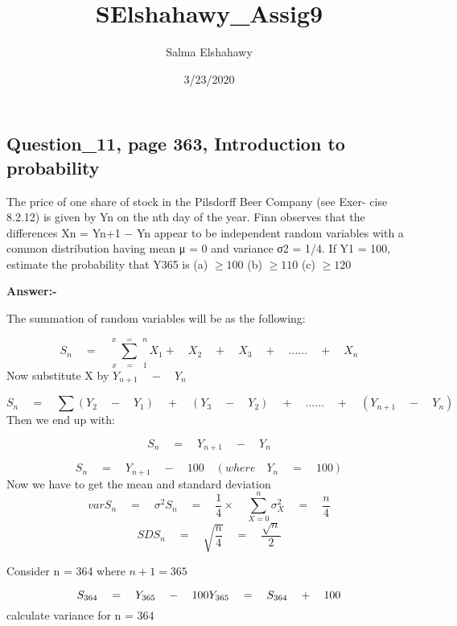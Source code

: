 \documentclass[]{article}
\title{SElshahawy\_Assig9}
\author{Salma Elshahawy}
\date{3/23/2020}
\begin{document}
\maketitle

\hypertarget{question_11-page-363-introduction-to-probability}{%
\subsection{Question\_11, page 363, Introduction to
probability}\label{question_11-page-363-introduction-to-probability}}

The price of one share of stock in the Pilsdorff Beer Company (see Exer-
cise 8.2.12) is given by Yn on the nth day of the year. Finn observes
that the differences Xn = Yn+1 − Yn appear to be independent random
variables with a common distribution having mean μ = 0 and variance σ2 =
1/4. If Y1 = 100, estimate the probability that Y365 is (a) \(\ge 100\)
(b) \(\ge 110\) (c) \(\ge 120\)

\textbf{Answer:-}

The summation of random variables will be as the following:

\[{ S }_{ n }\quad =\quad \sum _{ x\quad =\quad 1 }^{ x\quad =\quad n }{ { X }_{ 1 } } +\quad { X }_{ 2 }\quad +\quad { X }_{ 3 }\quad +\quad ......\quad +\quad { X }_{ n }\]
Now substitute X by \({ Y }_{ n+1 }\quad -\quad { Y }_{ n }\)

\[{ S }_{ n }\quad =\quad \sum { \left( { Y }_{ 2 }\quad -\quad { Y }_{ 1 } \right)  } \quad +\quad \left( { Y }_{ 3 }\quad -\quad { Y }_{ 2 } \right) \quad +\quad ......\quad +\quad \left( { Y }_{ n+1 }\quad -\quad { Y }_{ n } \right) \]
Then we end up with:

\[{ S }_{ n }\quad =\quad { Y }_{ n+1 }\quad -\quad { Y }_{ n }\]

\[{ S }_{ n }\quad =\quad { Y }_{ n+1 }\quad -\quad 100\quad (where\quad { Y }_{ n }\quad =\quad 100)\]
Now we have to get the mean and standard deviation
\[var{ S }_{ n }\quad =\quad { \sigma  }^{ 2 }{ S }_{ n }\quad =\quad \frac { 1 }{ 4 } \times \quad \sum _{ X=0 }^{ n }{ { { \sigma  } }_{ X }^{ 2 } } \quad =\quad \frac { n }{ 4 }\]
\[SD{ S }_{ n }\quad =\quad \sqrt { \frac { n }{ 4 }  } \quad =\quad \frac { \sqrt { n }  }{ 2 } \]

Consider n = 364 where \({ n+1 } = 365\)

\[{ S }_{ 364 }\quad =\quad { Y }_{ 365 }\quad -\quad 100\\ { Y }_{ 365 }\quad =\quad { S }_{ 364 }\quad +\quad 100\]
calculate variance for n = 364
\end{document}
